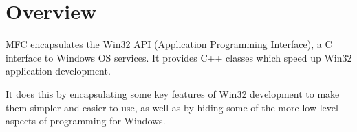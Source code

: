 \section{Overview}

MFC encapsulates the Win32 API (Application Programming Interface), a C interface to Windows OS services. It provides C++ classes which speed up Win32 application development.

It does this by encapsulating some key features of Win32 development to make them simpler and easier to use, as well as by hiding some of the more low-level aspects of programming for Windows.


